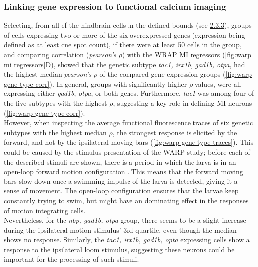 \documentclass[12pt, a4paper, oneside]{article}
\begin{document}
\subsubsection{Linking gene expression to functional calcium imaging}
\label{sec:link gene}
Selecting, from all of the hindbrain cells in the defined bounds (see \hyperref[sec:warp mi]{2.3.3}), groups of cells expressing two or more of the six overexpressed genes (expression being defined as at least one spot count), if there were at least 50 cells in the group, and comparing correlation (\textit{pearson's} $\rho$) with the WRAP MI regressors (\autoref{fig:warp mi regressors}D), showed that the genetic subtype \textit{tac1, irx1b, gad1b, otpa}, had the highest median \textit{pearson's} $\rho$ of the compared gene expression groups (\autoref{fig:warp gene type corr}). In general, groups with significantly higher $\rho$-values, were all expressing either \textit{gad1b}, \textit{otpa}, or both genes. Furthermore, \textit{tac1} was among four of the five subtypes with the highest $\rho$, suggesting a key role in defining MI neurons (\autoref{fig:warp gene type corr}).\\
However, when inspecting the average functional fluorescence traces of six genetic subtypes with the highest median  $\rho$, the strongest response is elicited by the forward, and not by the ipsilateral moving bars (\autoref{fig:warp gene type traces}). This could be caused by the stimulus presentation of the WARP study; before each of the described stimuli are shown, there is a period in which the larva is in an open-loop forward motion configuration \parencite{marquez-legorretaWholeBrainCoMappingGene2026}. This means that the forward moving bars slow down once a swimming impulse of the larva is detected, giving it a sense of movement. The open-loop configuration ensures that the larvae keep constantly trying to swim, but might have an dominating effect in the responses of motion integrating cells.\\
Nevertheless, for the \textit{nbp, gad1b, otpa} group, there seems to be a slight increase during the ipsilateral motion stimulus' 3rd quartile, even though the median shows no response. Similarly, the \textit{tac1, irx1b, gad1b, opta} expressing cells show a response to the ipsilateral loom stimulus, suggesting these neurons could be important for the processing of such stimuli.\\
\end{document}
